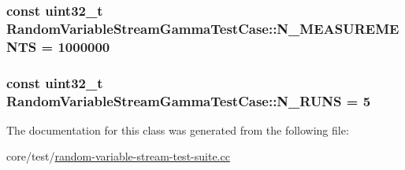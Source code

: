 \subsubsection[{\texorpdfstring{N\+\_\+\+M\+E\+A\+S\+U\+R\+E\+M\+E\+N\+TS}{N_MEASUREMENTS}}]{\setlength{\rightskip}{0pt plus 5cm}const uint32\+\_\+t Random\+Variable\+Stream\+Gamma\+Test\+Case\+::\+N\+\_\+\+M\+E\+A\+S\+U\+R\+E\+M\+E\+N\+TS = 1000000\hspace{0.3cm}{\ttfamily [static]}}\hypertarget{classRandomVariableStreamGammaTestCase_a7a498087c9e38b217f8253981df88c6d}{}\label{classRandomVariableStreamGammaTestCase_a7a498087c9e38b217f8253981df88c6d}
\subsubsection[{\texorpdfstring{N\+\_\+\+R\+U\+NS}{N_RUNS}}]{\setlength{\rightskip}{0pt plus 5cm}const uint32\+\_\+t Random\+Variable\+Stream\+Gamma\+Test\+Case\+::\+N\+\_\+\+R\+U\+NS = 5\hspace{0.3cm}{\ttfamily [static]}}\hypertarget{classRandomVariableStreamGammaTestCase_ab9ff0c8326bbfb837ccec51ae309b855}{}\label{classRandomVariableStreamGammaTestCase_ab9ff0c8326bbfb837ccec51ae309b855}


The documentation for this class was generated from the following file\+:\begin{DoxyCompactItemize}
\item 
core/test/\hyperlink{random-variable-stream-test-suite_8cc}{random-\/variable-\/stream-\/test-\/suite.\+cc}\end{DoxyCompactItemize}
